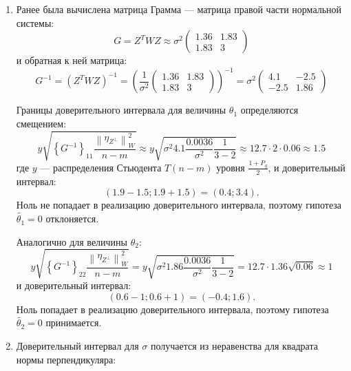 \documentclass[a4paper,12pt]{article}
\newcommand{\norm}[1]{\left \| #1 \right \|}
\newcommand{\pro}[2]{#1_{#2^\perp}}
\newcommand{\element}[2]{\left \{ #1 \right \}_{#2}}
\begin{document}
\begin{enumerate}
    \item
          Ранее была вычислена матрица Грамма --- матрица правой части нормальной системы:
          \[
              G
              = Z^T W Z
              \approx \sigma^2
              \begin{pmatrix}
                  1.36 & 1.83 \\
                  1.83 & 3
              \end{pmatrix}
          \]
          и обратная к ней матрица:
          \[
              G^{-1}
              = \left( Z^T W Z \right)^{-1}
              = \left(
              \frac{1}{\sigma^2}
              \begin{pmatrix}
                  1.36 & 1.83 \\
                  1.83 & 3
              \end{pmatrix}
              \right)^{-1}
              = \sigma^2
              \begin{pmatrix}
                  4.1  & -2.5 \\
                  -2.5 & 1.86
              \end{pmatrix}
          \]

          Границы доверительного интервала для величины $\theta_1$ определяются смещением:
          \[
              y \sqrt{\element{G^{-1}}{11} \frac{\norm{\pro{\eta}{Z}}_W^2}{n-m}}
              \approx y \sqrt{\sigma^2 4.1 \frac{0.0036}{\sigma^2} \frac{1}{3 - 2}}
              \approx 12.7 \cdot 2 \cdot 0.06
              \approx 1.5
          \]
          где $y$ --- распределения Стьюдента $T(n-m)$ уровня $\frac{1+P_g}{2}$, и доверительный интервал:
          \[
              \left( 1.9 - 1.5; 1.9 + 1.5 \right)
              = \left( 0.4; 3.4 \right) .
          \]
          Ноль не попадает в реализацию доверительного интервала, поэтому гипотеза $\widetilde{\theta_1} = 0$ отклоняется.

          Аналогично для величины $\theta_2$:
          \[
              y \sqrt{\element{G^{-1}}{22} \frac{\norm{\pro{\eta}{Z}}_W^2}{n-m}}
              = y \sqrt{\sigma^2 1.86 \frac{0.0036}{\sigma^2} \frac{1}{3 - 2}}
              = 12.7 \cdot 1.36 \sqrt{0.06}
              \approx 1
          \]
          и доверительный интервал:
          \[
              \left( 0.6 - 1; 0.6 + 1 \right)
              = \left( -0.4; 1.6 \right) .
          \]
          Ноль попадает в реализацию доверительного интервала, поэтому гипотеза $\widetilde{\theta_2} = 0$ принимается.

    \item Доверительный интервал для $\sigma$ получается из неравенства для квадрата нормы перпендикуляра:


\end{enumerate}
\end{document}
